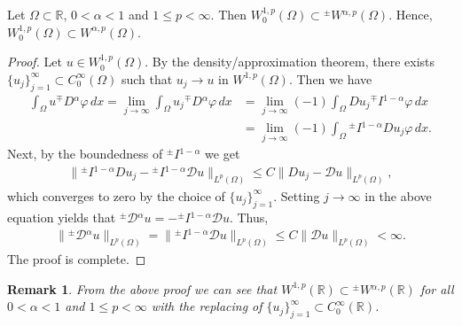 \documentclass[leqno,final]{siamltex}
\numberwithin{equation}{section}
\newtheorem{remark}{Remark}[section]
\renewcommand{\(}{\bigl(}
\renewcommand{\)}{\bigr)}
\newcommand{\R}{\mathbb{R}}
\begin{document}
        \begin{theorem}\label{TraceZeroConsistency}
             Let $\Omega \subset \R$, $0 <\alpha<1$ and $1 \leq p < \infty$. Then $W^{1,p}_{0}(\Omega) \subset {^{\pm}}{W}{^{\alpha,p}}(\Omega)$. Hence, $W^{1,p}_0(\Omega) \subset   {W}^{\alpha,p}(\Omega)$.
        \end{theorem}
    
        \begin{proof}
            Let $u \in W^{1,p}_{0}(\Omega)$. By the density/approximation theorem, there exists $\{u_j\}_{j=1}^{\infty} \subset C^{\infty}_{0}(\Omega)$ such that $u_j \rightarrow u$ in $W^{1,p}(\Omega)$. Then we have 
            \begin{align*}
                \int_{\Omega} u {^{\mp}}{D}{^{\alpha}}\varphi\, dx = \lim_{j \rightarrow \infty} \int_{\Omega} u_j {^{\mp}}{D}{^{\alpha}}\varphi \, dx
                &= \lim_{j\rightarrow \infty} (-1)\int_{\Omega}  Du_j {^{\mp}}{I}{^{1-\alpha}}\varphi \, dx \\
                &= \lim_{j \rightarrow \infty} (-1) \int_{\Omega}  {^{\pm}}{I}{^{1-\alpha}} Du_j \varphi \,dx .
            \end{align*}
            Next, by the boundedness of ${^{\pm}}{I}{^{1-\alpha}}$ we get 
            \begin{align*}
                \|{^{\pm}}{I}{^{1-\alpha}} Du_j - {^{\pm}}{I}{^{1-\alpha}} \mathcal{D}u\|_{L^{p}(\Omega)} \leq C \|Du_j - \mathcal{D}u \|_{L^{p}(\Omega)}, 
            \end{align*}
            which converges to zero by the choice of $\{u_j\}_{j=1}^{\infty}$. Setting $j\to \infty$ in the above 
            equation yields that ${^{\pm}}{\mathcal{D}}{^{\alpha}} u= - {^{\pm}}{I}{^{1-\alpha}} \mathcal{D}u$. 
            Thus, 
            \begin{align*}
                \|{^{\pm}}{\mathcal{D}}{^{\alpha}} u\|_{L^p(\Omega)} = \| {^{\pm}}{I}{^{1-\alpha}} \mathcal{D}u \|_{L^{p}(\Omega)} \leq C \|\mathcal{D}u\|_{L^p(\Omega)}<\infty.
            \end{align*}
            The proof is complete. 
        \end{proof}
        
        \begin{remark}
        	From the above proof we can see that $W^{1,p}(\R) \subset {^{\pm}}{W}{^{\alpha,p}}(\R)$
        	for all $0 <\alpha<1$ and $1 \leq p < \infty$ with the replacing of $\{u_j\}_{j=1}^{\infty} \subset C^{\infty}_{0}(\R)$.
        \end{remark}
        
\end{document}

